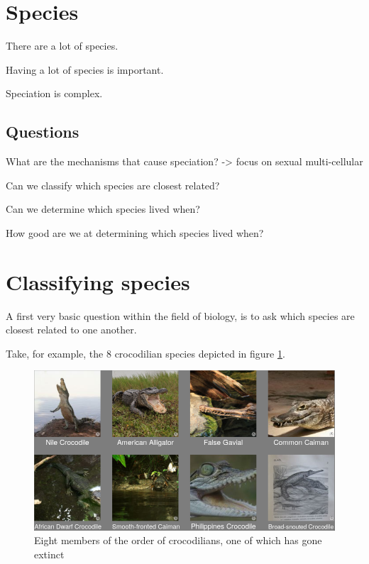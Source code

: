 {%
\section{Species}

There are a lot of species.

Having a lot of species is important.

Speciation is complex.

\subsection{Questions}

What are the mechanisms that cause speciation?
 -> focus on sexual multi-cellular

Can we classify which species are closest related?

Can we determine which species lived when?

How good are we at determining which species lived when?

\section{Classifying species}

A first very basic question within the field of biology,
is to ask which species are closest related to
one another. 

Take, for example, the 8 crocodilian species 
depicted in figure \ref{fig:crocodialians}.

\begin{figure}[H]
  \includegraphics[width=1.0\textwidth]{crocodilians.png}
  \caption{
    Eight members of the order of crocodilians, one of which
    has gone extinct
  }
  \label{fig:crocodialians}
\end{figure}

}
